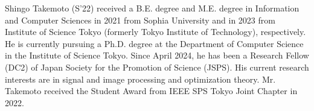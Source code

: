 \documentclass[10pt,journal]{IEEEtran}
\begin{document}


\vspace{11pt}


\begin{IEEEbiography}{Shingo Takemoto}
    (S’22) received a B.E. degree and M.E. degree in Information and Computer Sciences in 2021 from Sophia University and in 2023 from Institute of Science Tokyo (formerly Tokyo Institute of Technology), respectively. He is currently pursuing a Ph.D. degree at the Department of Computer Science in the Institute of Science Tokyo. Since April 2024, he has been a Research Fellow (DC2) of Japan Society for the Promotion of Science (JSPS). His current research interests are in signal and image processing and optimization theory. Mr. Takemoto received the Student Award from IEEE SPS Tokyo Joint Chapter in 2022.
\end{IEEEbiography}
\end{document}
